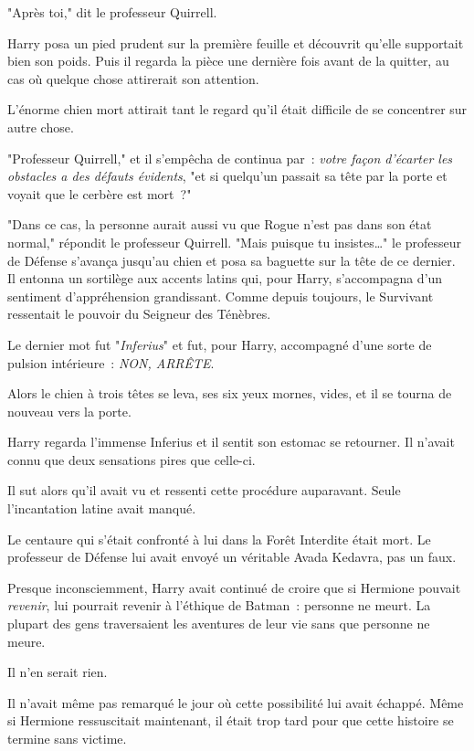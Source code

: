 "Après toi," dit le professeur Quirrell.

Harry posa un pied prudent sur la première feuille et découvrit qu'elle supportait bien son poids. Puis il regarda la pièce une dernière fois avant de la quitter, au cas où quelque chose attirerait son attention.

L'énorme chien mort attirait tant le regard qu'il était difficile de se concentrer sur autre chose.

"Professeur Quirrell," et il s'empêcha de continua par~: \emph{votre façon d'écarter les obstacles a des défauts évidents}, "et si quelqu'un passait sa tête par la porte et voyait que le cerbère est mort~?"

"Dans ce cas, la personne aurait aussi vu que Rogue n'est pas dans son état normal," répondit le professeur Quirrell. "Mais puisque tu insistes…" le professeur de Défense s'avança jusqu'au chien et posa sa baguette sur la tête de ce dernier. Il entonna un sortilège aux accents latins qui, pour Harry, s'accompagna d'un sentiment d'appréhension grandissant. Comme depuis toujours, le Survivant ressentait le pouvoir du Seigneur des Ténèbres.

Le dernier mot fut "\emph{Inferius}" et fut, pour Harry, accompagné d'une sorte de pulsion intérieure~: \emph{NON, ARRÊTE}.

Alors le chien à trois têtes se leva, ses six yeux mornes, vides, et il se tourna de nouveau vers la porte.

Harry regarda l'immense Inferius et il sentit son estomac se retourner. Il n'avait connu que deux sensations pires que celle-ci.

Il sut alors qu'il avait vu et ressenti cette procédure auparavant. Seule l'incantation latine avait manqué.

Le centaure qui s'était confronté à lui dans la Forêt Interdite était mort. Le professeur de Défense lui avait envoyé un véritable Avada Kedavra, pas un faux.

Presque inconsciemment, Harry avait continué de croire que si Hermione pouvait \emph{revenir}, lui pourrait revenir à l'éthique de Batman~: personne ne meurt. La plupart des gens traversaient les aventures de leur vie sans que personne ne meure.

Il n'en serait rien.

Il n'avait même pas remarqué le jour où cette possibilité lui avait échappé. Même si Hermione ressuscitait maintenant, il était trop tard pour que cette histoire se termine sans victime.

